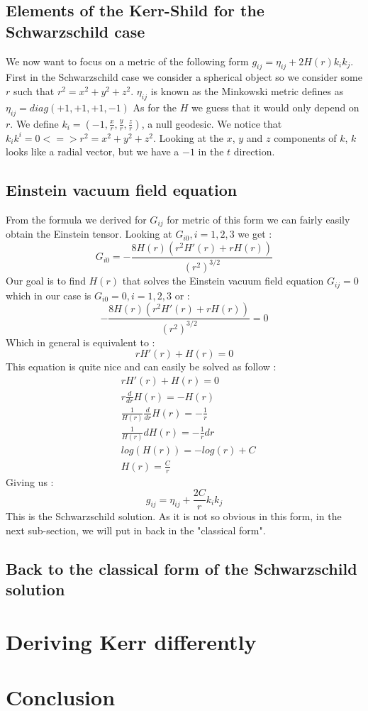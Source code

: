 \documentclass[a4paper,12pt]{article}
\begin{document}
\subsection{Elements of the Kerr-Shild for the Schwarzschild case}
We now want to focus on a metric of the following form $g_{ij}=\eta_{ij}+2H(r)k_ik_j$.
First in the Schwarzschild case we consider a spherical object so we consider some $r$ such that $r^2=x^2+y^2+z^2$.
$\eta_{ij}$ is known as the Minkowski metric defines as $\eta_{ij}=diag(+1,+1,+1,-1)$
As for the $H$ we guess that it would only depend on $r$.
We define $k_i=(-1,\frac{x}{r},\frac{y}{r},\frac{z}{r})$, a null geodesic.
We notice that $k_ik^i=0 <=> r^2=x^2+y^2+z^2$.
Looking at the $x$, $y$ and $z$ components of $k$, $k$ looks like a radial vector, but we have a $-1$ in the $t$ direction.
\subsection{Einstein vacuum field equation}
From the formula we derived for $G_{ij}$ for metric of this form we can fairly easily obtain the Einstein tensor.
Looking at $G_{i0}, i=1,2,3$ we get :
\begin{equation}
	G_{i0}=-\frac{8 H(r) \left(r^2 H'(r)+rH(r)\right)}{\left(r^2\right)^{3/2}}
\end{equation}
Our goal is to find $H(r)$ that solves the Einstein vacuum field equation $G_{ij}=0$ which in our case is $G_{i0}=0, i=1,2,3$ or :
\begin{equation}
	-\frac{8 H(r) \left(r^2 H'(r)+rH(r)\right)}{\left(r^2\right)^{3/2}}=0
\end{equation}
Which in general is equivalent to :
\begin{equation}
	rH'(r)+H(r)=0
\end{equation}
This equation is quite nice and can easily be solved as follow :
\begin{align*}
	&rH'(r)+H(r)=0\\
	&r\frac{d}{dr}H(r)=-H(r)\\
	&\frac{1}{H(r)}\frac{d}{dr}H(r)=-\frac{1}{r}\\
	&\frac{1}{H(r)}dH(r)=-\frac{1}{r}dr\\
	&log(H(r))=-log(r)+C\\
	&H(r)=\frac{C}{r}
\end{align*}
Giving us :
\begin{equation}
	g_{ij}=\eta_{ij}+\frac{2C}{r}k_ik_j
\end{equation}
This is the Schwarzschild solution. As it is not so obvious in this form, in the next sub-section, we will put in back in the "classical form".
\subsection{Back to the classical form of the Schwarzschild solution}

\section{Deriving Kerr differently}

\section{Conclusion}
\end{document}
